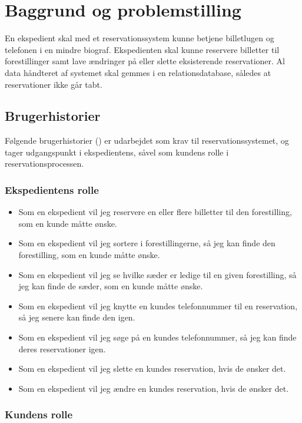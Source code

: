 \chapter{Baggrund og problemstilling}
\label{chapter:baggrund-og-problemstilling}

En ekspedient skal med et reservationssystem kunne betjene billetlugen og telefonen i en mindre biograf. Ekspedienten skal kunne reservere billetter til forestillinger samt lave ændringer på eller slette eksisterende reservationer. Al data håndteret af systemet skal gemmes i en relationsdatabase, således at reservationer ikke går tabt.

\section{Brugerhistorier}

Følgende brugerhistorier (\cite{wiki:user-story}) er udarbejdet som krav til reservationssystemet, og tager udgangspunkt i ekspedientens, såvel som kundens rolle i reservationsprocessen.

\subsection{Ekspedientens rolle}

\begin{itemize}
  \item Som en ekspedient vil jeg reservere en eller flere billetter til den forestilling, som en kunde måtte ønske.
  \item Som en ekspedient vil jeg sortere i forestillingerne, så jeg kan finde den forestilling, som en kunde måtte ønske.
  \item Som en ekspedient vil jeg se hvilke sæder er ledige til en given forestilling, så jeg kan finde de sæder, som en kunde måtte ønske.
  \item Som en ekspedient vil jeg knytte en kundes telefonnummer til en reservation, så jeg senere kan finde den igen.
  \item Som en ekspedient vil jeg søge på en kundes telefonnummer, så jeg kan finde deres reservationer igen.
  \item Som en ekspedient vil jeg slette en kundes reservation, hvis de ønsker det.
  \item Som en ekspedient vil jeg ændre en kundes reservation, hvis de ønsker det.
\end{itemize}
  
\subsection{Kundens rolle}

